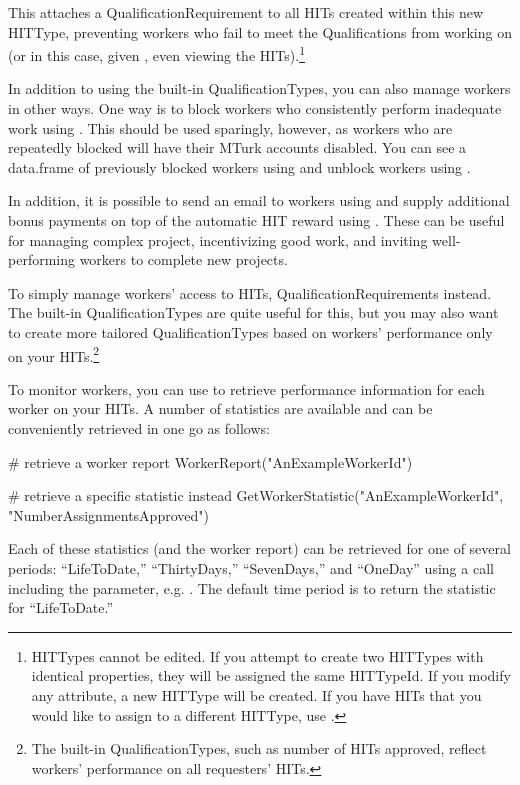 \noindent This attaches a QualificationRequirement to all HITs created within this new HITType, preventing workers who fail to meet the Qualifications from working on (or in this case, given , even viewing the HITs).\footnote{HITTypes cannot be edited. If you attempt to create two HITTypes with identical properties, they will be assigned the same HITTypeId. If you modify any attribute, a new HITType will be created. If you have HITs that you would like to assign to a different HITType, use .} 

In addition to using the built-in QualificationTypes, you can also manage workers in other ways. One way is to block workers who consistently perform inadequate work using . This should be used sparingly, however, as workers who are repeatedly blocked will have their MTurk accounts disabled. You can see a data.frame of previously blocked workers using  and unblock workers using . 

In addition, it is possible to send an email to workers using  and supply additional bonus payments on top of the automatic HIT reward using . These can be useful for managing complex project, incentivizing good work, and inviting well-performing workers to complete new projects.

To simply manage workers' access to HITs, QualificationRequirements instead. The built-in QualificationTypes are quite useful for this, but you may also want to create more tailored QualificationTypes based on workers' performance only on your HITs.\footnote{The built-in QualificationTypes, such as number of HITs approved, reflect workers' performance on all requesters' HITs.}

To monitor workers, you can use  to retrieve performance information for each worker on your HITs. A number of statistics are available and can be conveniently retrieved in one go as follows:

\begin{example}
# retrieve a worker report
WorkerReport("AnExampleWorkerId")

# retrieve a specific statistic instead
GetWorkerStatistic("AnExampleWorkerId", "NumberAssignmentsApproved")
\end{example}

\noindent Each of these statistics (and the worker report) can be retrieved for one of several periods: ``LifeToDate,'' ``ThirtyDays,'' ``SevenDays,'' and ``OneDay'' using a call including the  parameter, e.g. . The default time period is to return the statistic for ``LifeToDate.'' 

